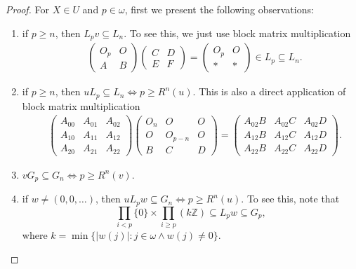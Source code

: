 \documentclass[11pt]{amsart}
\theoremstyle{definition}
\theoremstyle{remark}
\numberwithin{equation}{section}
\def\lh{{\mathrm{lh}}}
\begin{document}
\begin{proof}
    For $X\in U$ and $p\in\omega$, first we present the following observations:
    \begin{enumerate}
        \item[(i)] if $p\geq n$, then $L_pv\subseteq L_n$. To see this, we just use block matrix multiplication
        \begin{align*}
            &\begin{pmatrix}
                O_p & O \\
                A & B
            \end{pmatrix}\begin{pmatrix}
                C & D \\
                E & F
            \end{pmatrix}=\begin{pmatrix}
                O_p & O\\
                * & *
            \end{pmatrix}\in L_p\subseteq L_n.
        \end{align*}
        \item[(ii)] if $p\geq n$, then $uL_p\subseteq L_n\iff p\geq R^n(u)$. This is also a direct application of block matrix multiplication
        \begin{align*}
            &\begin{pmatrix}
                A_{00} & A_{01} & A_{02}\\
                A_{10} & A_{11} & A_{12}\\
                A_{20} & A_{21} & A_{22}
            \end{pmatrix}\begin{pmatrix}
                O_n & O & O\\
                O & O_{p-n} & O\\
                B & C & D
            \end{pmatrix}=\begin{pmatrix}
                A_{02}B & A_{02}C & A_{02}D\\
                A_{12}B & A_{12}C & A_{12}D\\
                A_{22}B & A_{22}C & A_{22}D
            \end{pmatrix}.
        \end{align*}
        \item[(iii)] $vG_p\subseteq G_n\iff p\geq R^n(v)$.
        \item[(iv)] if $w\neq(0,0,\dots)$, then $uL_pw\subseteq G_n\iff p\geq R^n(u)$. To see this, note that
        $$\prod_{i<p}\{0\}\times\prod_{i\geq p}(k\mathbb{Z})\subseteq L_pw\subseteq G_p,$$
        where $k=\min\{|w(j)|:j\in\omega\land w(j)\neq 0\}$.
    \end{enumerate}


\end{proof}
\end{document}
